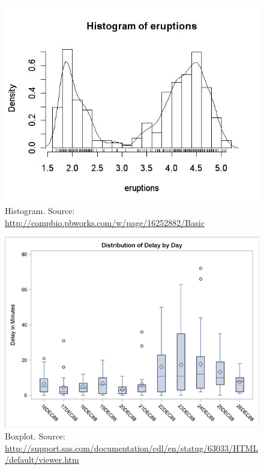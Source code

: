 \documentclass[12pt,a4paper]{report}
\begin{document}
\begin{figure}[h]
\centering
\includegraphics[height=0.3\textheight]{art/histogram_eruptions}
\caption[Histogram]{Histogram. Source: \url{http://compbio.pbworks.com/w/page/16252882/Basic}}
\label{fig:histogram_eruptions}
\end{figure}

\begin{figure}[h]
\centering
\includegraphics[height=0.3\textheight]{art/ex6aout}
\caption[BoxPlot]{Boxplot. Source: \url{http://support.sas.com/documentation/cdl/en/statug/63033/HTML/default/viewer.htm}}
\label{fig:boxplot}
\end{figure}
\end{document}
